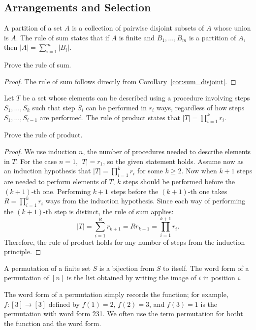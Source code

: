 \documentclass[../main.tex]{subfiles}
\begin{document}
\subsection{Arrangements and Selection}
\begin{defn}
    A \textsf{partition} of a set $A$ is a collection of pairwise disjoint subsets of $A$ whose union is $A$.
    The \textsf{rule of sum} states that if $A$ is finite and $B_1, \dots, B_m$ is a partition of $A$, then $|A| = \sum_{i = 1}^m |B_i|$.
\end{defn}

\begin{prob}
    Prove the rule of sum.
\end{prob}
\begin{proof}
    The rule of sum follows directly from Corollary~\ref{cor:sum_disjoint}.
\end{proof}

\begin{defn}
    Let $T$ be a set whose elements can be described using a procedure involving steps $S_1, \dots, S_k$ such that step $S_i$ can be performed in $r_i$ ways, regardless of how steps $S_1, \dots, S_{i-1}$ are performed.
    The \textsf{rule of product} states that $|T| = \prod_{i=1}^k r_i$.
\end{defn}

\begin{prob}
    Prove the rule of product.
\end{prob}
\begin{proof}
    We use induction $n$, the number of procedures needed to describe elements in $T$.
    For the case $n = 1$, $|T| = r_1$, so the given statement holds.
    Assume now as an induction hypothesis that $|T| = \prod_{i = 1}^k r_i$ for some $k \geq 2$.
    Now when $k + 1$ steps are needed to perform elements of $T$, $k$ steps should be performed before the $(k+1)$-th one.
    Performing $k + 1$ steps before the $(k+1)$-th one takes $R = \prod_{i=1}^k r_i$ ways from the induction hypothesis.
    Since each way of performing the $(k+1)$-th step is distinct, the rule of sum applies:
    \[
        |T| = \sum_{i=1}^{R} r_{k+1} = Rr_{k+1} = \prod_{i=1}^{k+1} r_i.
    \]
    Therefore, the rule of product holds for any number of steps from the induction principle.
\end{proof}

\begin{defn}
    A \textsf{permutation} of a finite set $S$ is a bijection from $S$ to itself.
    The \textsf{word form} of a permutation of $[n]$ is the list obtained by writing the image of $i$ in position $i$.
\end{defn}
\begin{ex}
    The word form of a permutation simply records the function; for example, $f: [3] \rightarrow [3]$ defined by $f(1) = 2$, $f(2) = 3$, and $f(3) = 1$ is the permutation with word form 231.
    We often use the term permutation for botht the function and the word form.
\end{ex}
\end{document}
